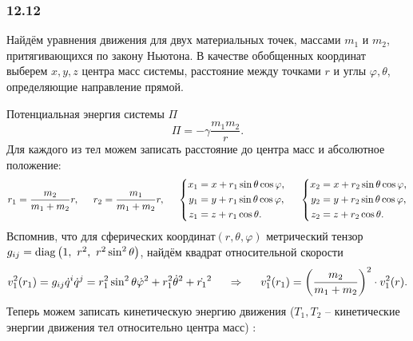 \subsubsection*{12.12}

Найдём уравнения движения для двух материальных точек, массами $m_1$ и $m_2$, притягивающихся по закону Ньютона. В качестве обобщенных координат выберем $x, y, z$ центра масс системы, расстояние между точками $r$ и углы $\varphi, \theta$, определяющие направление прямой. 

Потенциальная энергия системы $\Pi$ 
\begin{equation*}
    \Pi = - \gamma \frac{m_1 m_2}{r}.
\end{equation*}
Для каждого из тел можем записать расстояние до центра масс и абсолютное положение:
\begin{equation*}
    r_1 = \frac{m_2}{m_1+m_2} r, \hspace{0.5cm} 
    r_2 = \frac{m_1}{m_1+m_2} r,
    \hspace{0.5cm} 
    \left\{\begin{aligned}
        x_1 &= x + r_1 \sin \theta \cos \varphi, \\
        y_1 &= y + r_1 \sin \theta \cos \varphi, \\
        z_1 &= z + r_1 \cos \theta.
    \end{aligned}\right.
    \hspace{0.5cm} 
    \left\{\begin{aligned}
        x_2 &= x + r_2 \sin \theta \cos \varphi, \\
        y_2 &= y + r_2 \sin \theta \cos \varphi, \\
        z_2 &= z + r_2 \cos \theta.
    \end{aligned}\right.
\end{equation*}
Вспомнив, что для сферических координат$(r,  \theta, \varphi)$ метрический тензор $g_{ij} = \mathop{\mathrm{diag}}\nolimits \left({1}, \ {r^2}, \ {r^2 \sin^2 \theta} \right)$, найдём  квадрат относительной скорости
\begin{equation*}
    v_1^2(r_1) = g_{ij} \dot{q}^i \dot{q}^j = 
    r_1^2 \sin^2 \theta \dot{\varphi}^2 + r_1^2 \dot{\theta}^2 + \dot{r_1}^2 
    \hspace{0.5cm} \Rightarrow \hspace{0.5cm} 
    v_1^2(r_1) = \left(
    \frac{m_2}{m_1+m_2} 
    \right)^2 \cdot v_1^2 (r).
\end{equation*}
Теперь можем записать кинетическую энергию движения ($T_1, T_2$ -- кинетические энергии движения тел относительно центра масс) :
